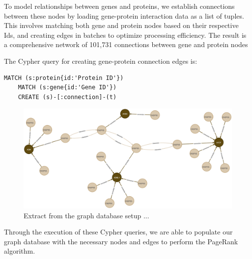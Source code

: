 To model relationships between genes and proteins,
we establish connections between these nodes by loading gene-protein interaction data as a list of tuples.
This involves matching both gene and protein nodes based on their respective Ids,
and creating edges in batches to optimize processing efficiency.
The result is a comprehensive network of 101,731 connections between gene and protein nodes

The Cypher query for creating gene-protein connection edges is:
\begin{lstlisting}[language=Cypher, label={lst:gene_protein_edges}]
    MATCH (s:protein{id:'Protein ID'})
    MATCH (s:gene{id:'Gene ID'})
    CREATE (s)-[:connection]-(t)
\end{lstlisting}

\begin{figure}[h]
    \centering
    \includegraphics[width=1\textwidth]{figures/03_02_Network_2}
    \caption{Extract from the graph database setup ...}
    \label{fig:03_02_Network_2}
\end{figure}

Through the execution of these Cypher queries,
we are able to populate our graph database with the necessary nodes and edges to perform the PageRank algorithm.\\